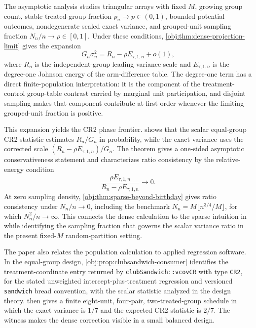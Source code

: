 \documentclass[11pt]{article}
\begin{document}
The asymptotic analysis studies triangular arrays with fixed \(M\), growing group count, stable treated-group fraction \(p_n\to p\in(0,1)\), bounded potential outcomes, nondegenerate scaled exact variance, and grouped-unit sampling fraction \(N_n/n\to\rho\in[0,1]\). Under these conditions, \cref{obj:thm:dense-projection-limit} gives the expansion
\[
G_n\sigma_n^2=R_n-\rho E_{\tau,1,n}+o(1),
\]
where \(R_n\) is the independent-group leading variance scale and \(E_{\tau,1,n}\) is the degree-one Johnson energy of the arm-difference table. The degree-one term has a direct finite-population interpretation: it is the component of the treatment-control group-table contrast carried by marginal unit participation, and disjoint sampling makes that component contribute at first order whenever the limiting grouped-unit fraction is positive.

This expansion yields the CR2 phase frontier.  shows that the scalar equal-group CR2 statistic estimates \(R_n/G_n\) in probability, while the exact variance uses the corrected scale \((R_n-\rho E_{\tau,1,n})/G_n\). The theorem gives a one-sided asymptotic conservativeness statement and characterizes ratio consistency by the relative-energy condition
\[
\frac{\rho E_{\tau,1,n}}{R_n-\rho E_{\tau,1,n}}\to0.
\]
At zero sampling density, \cref{obj:thm:sparse-beyond-birthday} gives ratio consistency under \(N_n/n\to0\), including the benchmark \(N_n=M\lfloor n^{3/4}/M\rfloor\), for which \(N_n^2/n\to\infty\). This connects the dense calculation to the sparse intuition in \citet{FuSamiiWang2026} while identifying the sampling fraction that governs the scalar variance ratio in the present fixed-\(M\) random-partition setting.

The paper also relates the population calculation to applied regression software. In the equal-group design, \cref{obj:prop:clubsandwich-consumer} identifies the treatment-coordinate entry returned by \texttt{clubSandwich::vcovCR} with type \texttt{CR2}, for the stated unweighted intercept-plus-treatment regression and versioned \texttt{sandwich} bread convention, with the scalar statistic analyzed in the design theory.  then gives a finite eight-unit, four-pair, two-treated-group schedule in which the exact variance is \(1/7\) and the expected CR2 statistic is \(2/7\). The witness makes the dense correction visible in a small balanced design.
\end{document}
